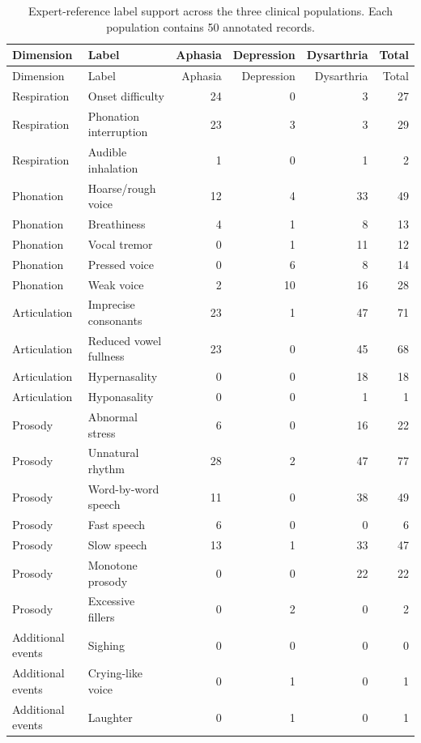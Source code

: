 \documentclass[10pt]{article}
\begin{document}
\begin{longtable}{llrrrr}
\caption{Expert-reference label support across the three clinical populations. Each population contains 50 annotated records.}\label{tab:pop_label_support}\\
\toprule
Dimension & Label & Aphasia & Depression & Dysarthria & Total \\
\midrule
\endfirsthead
\toprule
Dimension & Label & Aphasia & Depression & Dysarthria & Total \\
\midrule
\endhead

Respiration & Onset difficulty & 24 & 0 & 3 & 27 \\
Respiration & Phonation interruption & 23 & 3 & 3 & 29 \\
Respiration & Audible inhalation & 1 & 0 & 1 & 2 \\
Phonation & Hoarse/rough voice & 12 & 4 & 33 & 49 \\
Phonation & Breathiness & 4 & 1 & 8 & 13 \\
Phonation & Vocal tremor & 0 & 1 & 11 & 12 \\
Phonation & Pressed voice & 0 & 6 & 8 & 14 \\
Phonation & Weak voice & 2 & 10 & 16 & 28 \\
Articulation & Imprecise consonants & 23 & 1 & 47 & 71 \\
Articulation & Reduced vowel fullness & 23 & 0 & 45 & 68 \\
Articulation & Hypernasality & 0 & 0 & 18 & 18 \\
Articulation & Hyponasality & 0 & 0 & 1 & 1 \\
Prosody & Abnormal stress & 6 & 0 & 16 & 22 \\
Prosody & Unnatural rhythm & 28 & 2 & 47 & 77 \\
Prosody & Word-by-word speech & 11 & 0 & 38 & 49 \\
Prosody & Fast speech & 6 & 0 & 0 & 6 \\
Prosody & Slow speech & 13 & 1 & 33 & 47 \\
Prosody & Monotone prosody & 0 & 0 & 22 & 22 \\
Prosody & Excessive fillers & 0 & 2 & 0 & 2 \\
Additional events & Sighing & 0 & 0 & 0 & 0 \\
Additional events & Crying-like voice & 0 & 1 & 0 & 1 \\
Additional events & Laughter & 0 & 1 & 0 & 1 \\
\bottomrule
\end{longtable}
\end{document}
